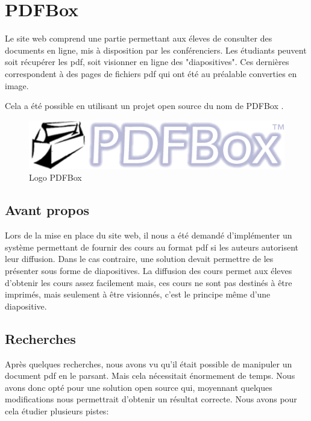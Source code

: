 \chapter{PDFBox}

Le site web comprend une partie permettant aux éleves de consulter des documents
en ligne, mis à disposition par les conférenciers.
Les étudiants peuvent soit récupérer les pdf, soit visionner en ligne des "diapositives".
Ces dernières correspondent à des pages de fichiers pdf qui ont été au préalable converties en image. 

Cela a été possible en utilisant un projet open source du nom de PDFBox \cite{pdfbox}.

    \begin{figure}[h]
        \begin{center}
            \includegraphics[scale=0.6]{images/PDFBox.png} 
        \end{center}

        \caption{Logo PDFBox}
        \label{Logo PDFBox}
    \end{figure}

    \section{Avant propos}

Lors de la mise en place du site web, il nous a été demandé d'implémenter un 
système permettant de fournir des cours au format pdf si les auteurs autorisent
leur diffusion. Dans le cas contraire, une solution devait permettre de les présenter sous forme de diapositives.
La diffusion des cours permet aux éleves d'obtenir les cours assez facilement mais,
ces cours ne sont pas destinés à être imprimés, mais seulement à être visionnés,
c'est le principe même d'une diapositive.
    
   \section{Recherches}

Après quelques recherches, nous avons vu qu'il était 
possible de manipuler un document pdf en le parsant. Mais cela nécessitait 
énormement de temps. Nous avons donc opté pour une solution open source
qui, moyennant quelques modifications nous permettrait d'obtenir un résultat
correcte.
Nous avons pour cela étudier plusieurs pistes:

